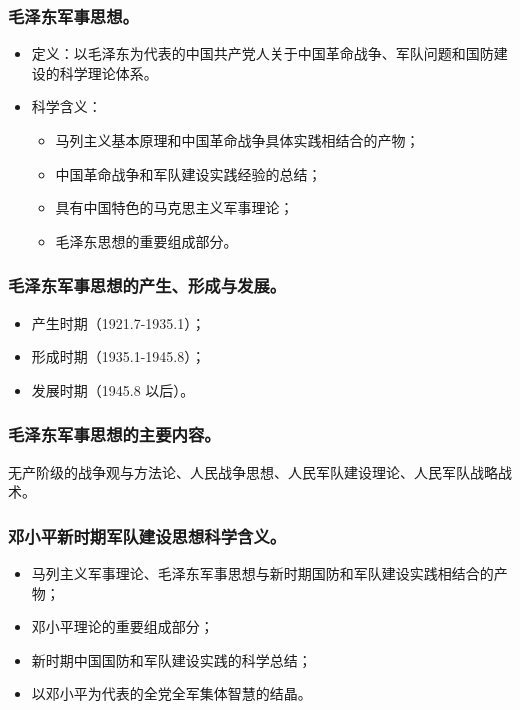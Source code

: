 \documentclass{article}
\begin{document}
\subsubsection{毛泽东军事思想。}
\begin{itemize}
    \item 定义：以毛泽东为代表的中国共产党人关于中国革命战争、军队问题和国防建设的科学理论体系。
    \item 科学含义：
    \begin{itemize}
        \item 马列主义基本原理和中国革命战争具体实践相结合的产物；
        \item 中国革命战争和军队建设实践经验的总结；
        \item 具有中国特色的马克思主义军事理论；
        \item 毛泽东思想的重要组成部分。
    \end{itemize}
\end{itemize}

\subsubsection{毛泽东军事思想的产生、形成与发展。}
\begin{itemize}
    \item 产生时期（1921.7-1935.1）；
    \item 形成时期（1935.1-1945.8）；
    \item 发展时期（1945.8 以后）。
\end{itemize}

\subsubsection{毛泽东军事思想的主要内容。}
无产阶级的战争观与方法论、人民战争思想、人民军队建设理论、人民军队战略战术。

\subsubsection{邓小平新时期军队建设思想科学含义。}
\begin{itemize}
    \item 马列主义军事理论、毛泽东军事思想与新时期国防和军队建设实践相结合的产物；
    \item 邓小平理论的重要组成部分；
    \item 新时期中国国防和军队建设实践的科学总结；
    \item 以邓小平为代表的全党全军集体智慧的结晶。
\end{itemize}
\end{document}
